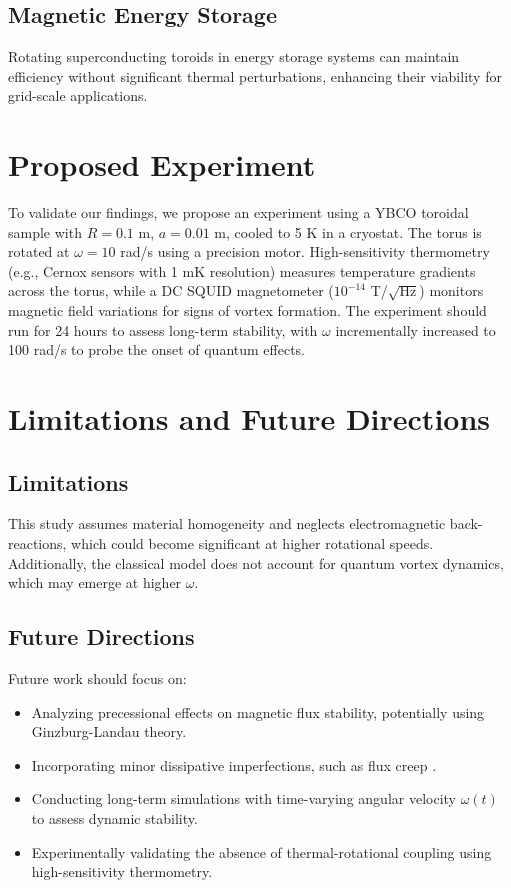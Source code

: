\documentclass[12pt]{article}
\begin{document}
\subsection{Magnetic Energy Storage}
Rotating superconducting toroids in energy storage systems can maintain efficiency without significant thermal perturbations, enhancing their viability for grid-scale applications.

\section{Proposed Experiment}
To validate our findings, we propose an experiment using a YBCO toroidal sample with $R = 0.1$ m, $a = 0.01$ m, cooled to 5 K in a cryostat. The torus is rotated at $\omega = 10$ rad/s using a precision motor. High-sensitivity thermometry (e.g., Cernox sensors with 1 mK resolution) measures temperature gradients across the torus, while a DC SQUID magnetometer ($10^{-14}$ T/$\sqrt{\text{Hz}}$) monitors magnetic field variations for signs of vortex formation. The experiment should run for 24 hours to assess long-term stability, with $\omega$ incrementally increased to 100 rad/s to probe the onset of quantum effects.

\section{Limitations and Future Directions}
\subsection{Limitations}
This study assumes material homogeneity and neglects electromagnetic back-reactions, which could become significant at higher rotational speeds. Additionally, the classical model does not account for quantum vortex dynamics, which may emerge at higher $\omega$.

\subsection{Future Directions}
Future work should focus on:
\begin{itemize}
    \item Analyzing precessional effects on magnetic flux stability, potentially using Ginzburg-Landau theory.
    \item Incorporating minor dissipative imperfections, such as flux creep \citep{Anderson1962}.
    \item Conducting long-term simulations with time-varying angular velocity $\omega(t)$ to assess dynamic stability.
    \item Experimentally validating the absence of thermal-rotational coupling using high-sensitivity thermometry.
\end{itemize}
\end{document}
